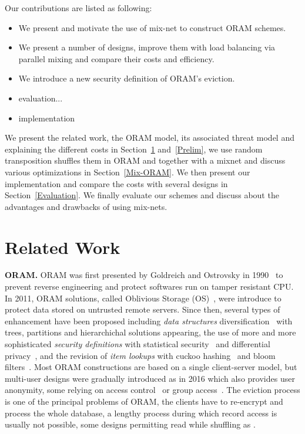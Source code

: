 \documentclass[USenglish,oneside,twocolumn]{article}
\begin{document}
Our contributions are listed as following:

\begin{itemize}
 \item We present and motivate the use of mix-net to construct ORAM schemes.
 \item We present a number of designs, improve them with load balancing via parallel mixing and compare their costs and efficiency.
 \item We introduce a new security definition of ORAM's eviction. %
 \item evaluation...
 \item implementation
\end{itemize}

We present the related work, the ORAM model, its associated threat model and explaining the different costs in Section~\ref{Related} and~\ref{Prelim}, we use random transposition shuffles them in ORAM and together with a mixnet and discuss various optimizations in Section~\ref{Mix-ORAM}. We then present our implementation and compare the costs with several designs in Section~\ref{Evaluation}.
We finally evaluate our schemes and discuss about the advantages and drawbacks of using mix-nets.
%

\section{Related Work}\label{Related}
\noindent\textbf{ORAM.}
ORAM was first presented by Goldreich and Ostrovsky in 1990~\cite{ostrovsky1990efficient} to prevent reverse engineering and protect softwares run on tamper resistant CPU. In 2011, ORAM solutions, called Oblivious Storage (OS)~\cite{boneh2011}, were introduce to protect data stored on untrusted remote servers.
Since then, several types of enhancement have been proposed including \textit{data structures} diversification~\cite{goldreich1996software,stefanov2011towards,stefanov2013path,ren2014ring} with trees, partitions and hierarchichal solutions appearing,
the use of more and more sophisticated \textit{security definitions} with statistical security~\cite{damgaard2011perfectly,ajtai2010oblivious} and differential privacy~\cite{wagh2016root}, and the revision of \textit{item lookups} with cuckoo hashing~\cite{pinkas2010oblivious} and bloom filters~\cite{williams2008building}.
Most ORAM constructions are based on a single client-server model, but multi-user designs were gradually introduced as \cite{backesanonymous} in 2016 which also provides user anonymity, some relying on access control~\cite{franz2011oblivious} or group access~\cite{goodrich2012privacy}.
The eviction process is one of the principal problems of ORAM, the clients have to re-encrypt and process the whole database, a lengthy process during which record access is usually not possible, some designs permitting read while shuffling as \cite{boneh2011}.\\
\end{document}
